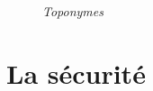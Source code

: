 \begin{center}
\begin{figure}[ht]
\caption{\label{toponymes}\textit{Toponymes}}
\end{figure}
\end{center}
\chapter{La sécurité}
